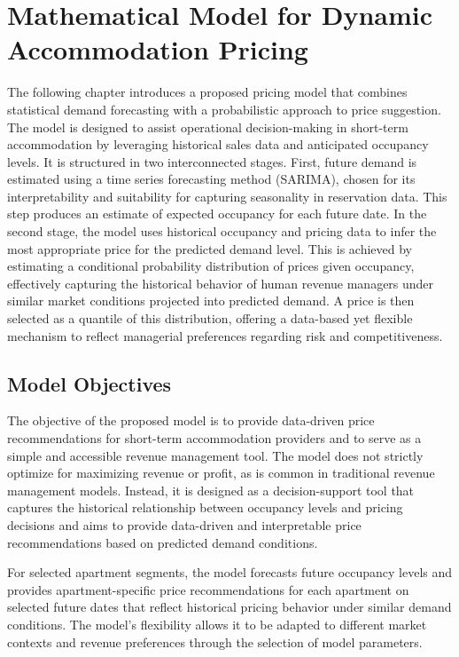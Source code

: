 \chapter{Mathematical Model for Dynamic Accommodation Pricing}

The following chapter introduces a proposed pricing model that combines statistical demand forecasting with a probabilistic approach to price suggestion. The model is designed to assist operational decision-making in short-term accommodation by leveraging historical sales data and anticipated occupancy levels. It is structured in two interconnected stages. First, future demand is estimated using a time series forecasting method (SARIMA), chosen for its interpretability and suitability for capturing seasonality in reservation data. This step produces an estimate of expected occupancy for each future date. In the second stage, the model uses historical occupancy and pricing data to infer the most appropriate price for the predicted demand level. This is achieved by estimating a conditional probability distribution of prices given occupancy, effectively capturing the historical behavior of human revenue managers under similar market conditions projected into predicted demand. A price is then selected as a quantile of this distribution, offering a data-based yet flexible mechanism to reflect managerial preferences regarding risk and competitiveness.

\section{Model Objectives}
The objective of the proposed model is to provide data-driven price recommendations for short-term accommodation providers and to serve as a simple and accessible revenue management tool. The model does not strictly optimize for maximizing revenue or profit, as is common in traditional revenue management models. Instead, it is designed as a decision-support tool that captures the historical relationship between occupancy levels and pricing decisions and aims to provide data-driven and interpretable price recommendations based on predicted demand conditions.

For selected apartment segments, the model forecasts future occupancy levels and provides apartment-specific price recommendations for each apartment on selected future dates that reflect historical pricing behavior under similar demand conditions. The model's flexibility allows it to be adapted to different market contexts and revenue preferences through the selection of model parameters.

